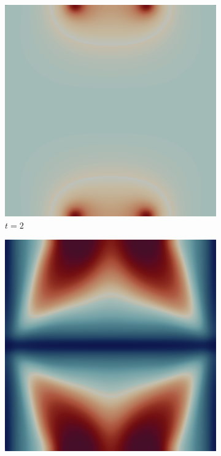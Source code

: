 \vfill\pagebreak

\begin{figure}[H]
    \centering
    \caption{Unit Square with Two Sinks: Filtered Distribution}
    \begin{subfigure}{.4\textwidth}
        \includegraphics[width=\textwidth]{imgs/UnitSquare2/first.png}
        \caption{$t = 2$}
    \end{subfigure}
    \begin{subfigure}{.4\textwidth}
        \includegraphics[width=\textwidth]{imgs/UnitSquare2/second.png}

\end{subfigure}
\end{figure}
